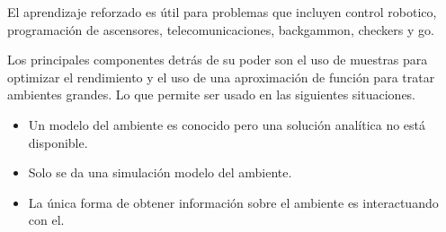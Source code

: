 \documentclass{article}
\begin{document}
El aprendizaje reforzado es útil para problemas que incluyen control robotico, programación de ascensores, telecomunicaciones, backgammon, checkers y go.

Los principales componentes detrás de su poder son el uso de muestras para optimizar el rendimiento y el uso de una aproximación de función para tratar ambientes grandes. Lo que permite ser usado en las siguientes situaciones.
\begin{itemize}
	\item Un modelo del ambiente es conocido pero una solución analítica no está disponible.
	\item Solo se da una simulación modelo del ambiente.
	\item La única forma de obtener información sobre el ambiente es interactuando con el.
\end{itemize}
\end{document}
